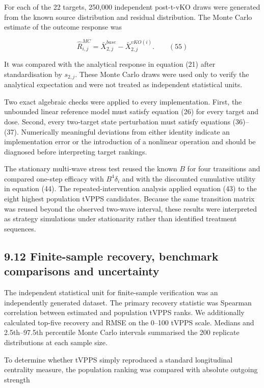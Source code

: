 \documentclass[11pt]{article}
\begin{document}
For each of the 22 targets, 250,000 independent post-t-vKO draws were
generated from the known source distribution and residual distribution.
The Monte Carlo estimate of the outcome response was

\[{\widehat{R}}_{i,j}^{MC} = {\bar{X}}_{2,j}^{base} - {\bar{X}}_{2,j}^{vKO(i)}.\quad\quad(55)\]

It was compared with the analytical response in equation (21) after
standardisation by \(s_{2,j}\). These Monte Carlo draws were used only
to verify the analytical expectation and were not treated as independent
statistical units.

Two exact algebraic checks were applied to every implementation. First,
the unbounded linear reference model must satisfy equation (26) for
every target and dose. Second, every two-target state perturbation must
satisfy equations (36)--(37). Numerically meaningful deviations from
either identity indicate an implementation error or the introduction of
a nonlinear operation and should be diagnosed before interpreting target
rankings.

The stationary multi-wave stress test reused the known \(B\) for four
transitions and compared one-step efficacy with \(B^{4}\delta_{i}\) and
with the discounted cumulative utility in equation (44). The
repeated-intervention analysis applied equation (43) to the eight
highest population tVPPS candidates. Because the same transition matrix
was reused beyond the observed two-wave interval, these results were
interpreted as strategy simulations under stationarity rather than
identified treatment sequences.

\subsection{9.12 Finite-sample recovery, benchmark comparisons and
uncertainty}\label{finite-sample-recovery-benchmark-comparisons-and-uncertainty}

The independent statistical unit for finite-sample verification was an
independently generated dataset. The primary recovery statistic was
Spearman correlation between estimated and population tVPPS ranks. We
additionally calculated top-five recovery and RMSE on the 0--100 tVPPS
scale. Medians and 2.5th--97.5th percentile Monte Carlo intervals
summarised the 200 replicate distributions at each sample size.

To determine whether tVPPS simply reproduced a standard longitudinal
centrality measure, the population ranking was compared with absolute
outgoing strength
\end{document}
